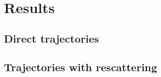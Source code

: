 \section{\label{sec:spa_results} Results}

\subsection{\label{sec:spa_direct} Direct trajectories}

\subsection{\label{sec:spa_resc} Trajectories with rescattering}







